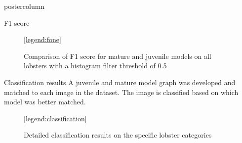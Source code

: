 \documentclass{beamer}
\begin{document}
\begin{frame}
\begin{columns}
\begin{column}{.57\textwidth}
\begin{beamercolorbox}[center]{postercolumn}
\begin{minipage}{.98\textwidth}
{\begin{myblock}{F1 score}
\begin{minipage}{0.9\textwidth}
\begin{figure}[H]
\centering
\begin{minipage}{0.48\textwidth}
\end{minipage}
\hspace*{\fill}
\begin{minipage}{0.48\textwidth}
\end{minipage}
\hspace*{\fill}\ref{legend:fone}
\caption{Comparison of F1 score for mature and juvenile models on all lobsters with a histogram filter threshold of 0.5}
\end{figure}
\end{minipage}

\end{myblock}


\begin{myblock}{Classification results}
A juvenile and mature model graph was developed and matched to each image in the dataset. The image is classified based on which model was better matched.
\begin{figure}[H]
\centering
{}
\ref{legend:classification}
\caption{Detailed classification results on the specific lobster categories}
\end{figure}


\end{myblock}\vfill


}\end{minipage}
\end{beamercolorbox}
\end{column}

\end{columns}
\end{frame}
\end{document}
